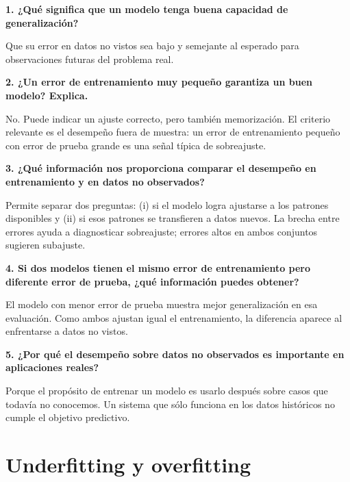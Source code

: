 \documentclass[11pt]{article}
\newcommand{\pregunta}[1]{\vspace{2mm}\textbf{#1}}
\begin{document}
\pregunta{1. ¿Qué significa que un modelo tenga buena capacidad de generalización?}
\begin{respuesta}
Que su error en datos no vistos sea bajo y semejante al esperado para observaciones futuras del problema real.
\end{respuesta}

\pregunta{2. ¿Un error de entrenamiento muy pequeño garantiza un buen modelo? Explica.}
\begin{respuesta}
No. Puede indicar un ajuste correcto, pero también memorización. El criterio relevante es el desempeño fuera de muestra: un error de entrenamiento pequeño con error de prueba grande es una señal típica de sobreajuste.
\end{respuesta}

\pregunta{3. ¿Qué información nos proporciona comparar el desempeño en entrenamiento y en datos no observados?}
\begin{respuesta}
Permite separar dos preguntas: (i) si el modelo logra ajustarse a los patrones disponibles y (ii) si esos patrones se transfieren a datos nuevos. La brecha entre errores ayuda a diagnosticar sobreajuste; errores altos en ambos conjuntos sugieren subajuste.
\end{respuesta}

\pregunta{4. Si dos modelos tienen el mismo error de entrenamiento pero diferente error de prueba, ¿qué información puedes obtener?}
\begin{respuesta}
El modelo con menor error de prueba muestra mejor generalización en esa evaluación. Como ambos ajustan igual el entrenamiento, la diferencia aparece al enfrentarse a datos no vistos.
\end{respuesta}

\pregunta{5. ¿Por qué el desempeño sobre datos no observados es importante en aplicaciones reales?}
\begin{respuesta}
Porque el propósito de entrenar un modelo es usarlo después sobre casos que todavía no conocemos. Un sistema que sólo funciona en los datos históricos no cumple el objetivo predictivo.
\end{respuesta}

\section{Underfitting y overfitting}
\end{document}
